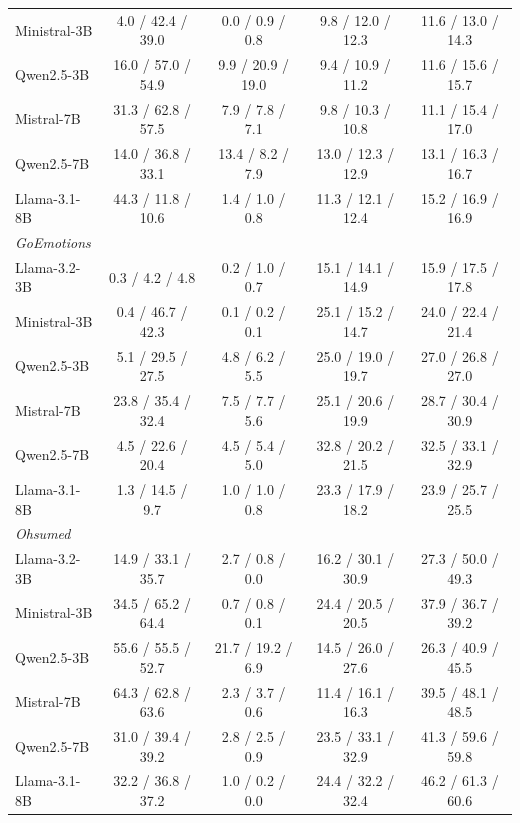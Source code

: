 \begin{tabular}{lcccc}
Ministral-3B & 4.0 / 42.4 / 39.0 & 0.0 / 0.9 / 0.8 & 9.8 / 12.0 / 12.3 & 11.6 / 13.0 / 14.3 \\
Qwen2.5-3B & 16.0 / 57.0 / 54.9 & 9.9 / 20.9 / 19.0 & 9.4 / 10.9 / 11.2 & 11.6 / 15.6 / 15.7 \\
Mistral-7B & 31.3 / 62.8 / 57.5 & 7.9 / 7.8 / 7.1 & 9.8 / 10.3 / 10.8 & 11.1 / 15.4 / 17.0 \\
Qwen2.5-7B & 14.0 / 36.8 / 33.1 & 13.4 / 8.2 / 7.9 & 13.0 / 12.3 / 12.9 & 13.1 / 16.3 / 16.7 \\
Llama-3.1-8B & 44.3 / 11.8 / 10.6 & 1.4 / 1.0 / 0.8 & 11.3 / 12.1 / 12.4 & 15.2 / 16.9 / 16.9 \\
\midrule
\multicolumn{5}{l}{\emph{GoEmotions}} \\
Llama-3.2-3B & 0.3 / 4.2 / 4.8 & 0.2 / 1.0 / 0.7 & 15.1 / 14.1 / 14.9 & 15.9 / 17.5 / 17.8 \\
Ministral-3B & 0.4 / 46.7 / 42.3 & 0.1 / 0.2 / 0.1 & 25.1 / 15.2 / 14.7 & 24.0 / 22.4 / 21.4 \\
Qwen2.5-3B & 5.1 / 29.5 / 27.5 & 4.8 / 6.2 / 5.5 & 25.0 / 19.0 / 19.7 & 27.0 / 26.8 / 27.0 \\
Mistral-7B & 23.8 / 35.4 / 32.4 & 7.5 / 7.7 / 5.6 & 25.1 / 20.6 / 19.9 & 28.7 / 30.4 / 30.9 \\
Qwen2.5-7B & 4.5 / 22.6 / 20.4 & 4.5 / 5.4 / 5.0 & 32.8 / 20.2 / 21.5 & 32.5 / 33.1 / 32.9 \\
Llama-3.1-8B & 1.3 / 14.5 / 9.7 & 1.0 / 1.0 / 0.8 & 23.3 / 17.9 / 18.2 & 23.9 / 25.7 / 25.5 \\
\midrule
\multicolumn{5}{l}{\emph{Ohsumed}} \\
Llama-3.2-3B & 14.9 / 33.1 / 35.7 & 2.7 / 0.8 / 0.0 & 16.2 / 30.1 / 30.9 & 27.3 / 50.0 / 49.3 \\
Ministral-3B & 34.5 / 65.2 / 64.4 & 0.7 / 0.8 / 0.1 & 24.4 / 20.5 / 20.5 & 37.9 / 36.7 / 39.2 \\
Qwen2.5-3B & 55.6 / 55.5 / 52.7 & 21.7 / 19.2 / 6.9 & 14.5 / 26.0 / 27.6 & 26.3 / 40.9 / 45.5 \\
Mistral-7B & 64.3 / 62.8 / 63.6 & 2.3 / 3.7 / 0.6 & 11.4 / 16.1 / 16.3 & 39.5 / 48.1 / 48.5 \\
Qwen2.5-7B & 31.0 / 39.4 / 39.2 & 2.8 / 2.5 / 0.9 & 23.5 / 33.1 / 32.9 & 41.3 / 59.6 / 59.8 \\
Llama-3.1-8B & 32.2 / 36.8 / 37.2 & 1.0 / 0.2 / 0.0 & 24.4 / 32.2 / 32.4 & 46.2 / 61.3 / 60.6 \\
\bottomrule
\end{tabular}
